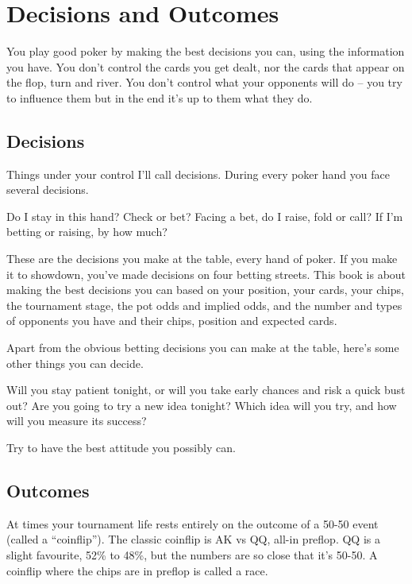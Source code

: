 \chapter{Decisions and Outcomes}


You play good poker by making the best decisions you can,
using the information you have. You don't control the cards
you get dealt, nor the cards that appear on the flop, turn and river.
You don't control what your opponents will do -- you try to influence
them but in the end it's up to them what they do.


\section{Decisions}

Things under your control I'll call decisions. During
every poker hand you face several decisions.

Do I stay in this hand? Check or bet? Facing a bet, do I
raise, fold or call? If I'm betting or raising, by how much?

These are the decisions you make at the table, every hand
of poker. If you make it to showdown, you've made decisions on four
betting streets. This book is about making the best
decisions you can based on your position, your cards, your chips,
the tournament stage, the pot odds and implied odds, and the number
and types of opponents you have and their chips, position and
expected cards.

Apart from the obvious betting decisions you can make at the table,
here's some other things you can decide.

Will you stay patient tonight, or will you take early chances and risk
a quick bust out? Are you going to try a new idea tonight? Which idea
will you try, and how will you measure its success?

Try to have the best attitude you possibly can.

\section{Outcomes}

At times your tournament life rests entirely on the outcome of
a 50-50 event (called a ``coinflip'').
The classic coinflip is AK vs QQ, all-in preflop. QQ is a slight
favourite, 52\% to 48\%, but the numbers are so close that it's 50-50.
A coinflip where the chips are in preflop is called a race.


